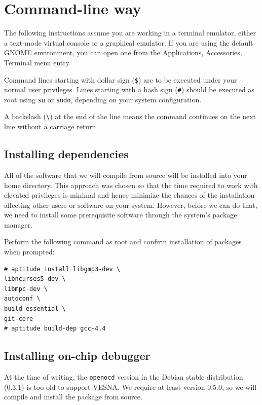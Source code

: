 \documentclass[a4paper, 10pt]{article}
\begin{document}
\newpage

\section{Command-line way}

The following instructions assume you are working in a terminal emulator,
either a text-mode virtual console or a graphical emulator. If you are using the
default GNOME environment, you can open one from the Applications, Accessories,
Terminal menu entry.

Command lines starting with dollar sign (\verb|$|) are to be executed under your
normal user privileges. Lines starting with a hash sign (\verb|#|) should be
executed as root using \verb|su| or \verb|sudo|, depending on your system
configuration.

A backslash (\verb|\|) at the end of the line means the command continues on the
next line without a carriage return.

\subsection{Installing dependencies}

All of the software that we will compile from source will be installed into
your home directory. This approach was chosen so that the time required to
work with elevated privileges is minimal and hence minimize the chances of the
installation affecting other users or software on your system. However, before
we can do that, we need to install some prerequisite software through the
system's package manager.

Perform the following command as root and confirm installation of packages
when prompted:

\begin{verbatim}
# aptitude install libgmp3-dev \
libncurses5-dev \
libmpc-dev \
autoconf \
build-essential \
git-core
# aptitude build-dep gcc-4.4
\end{verbatim}

\subsection{Installing on-chip debugger}

At the time of writing, the \verb|openocd| version in the Debian stable
distribution (0.3.1) is too old to support VESNA. We require at least version 0.5.0, so
we will compile and install the package from source.
\end{document}
